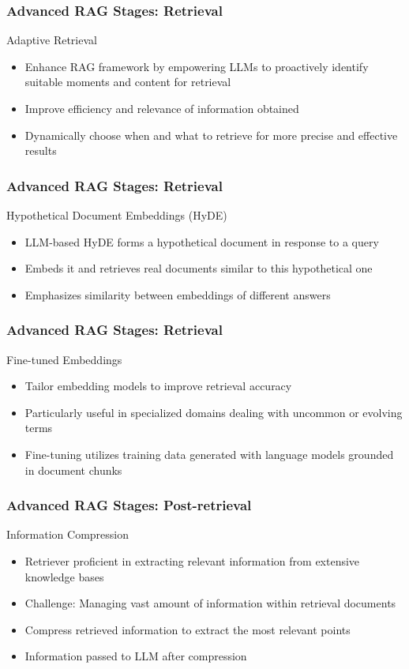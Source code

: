 \begin{frame}[fragile]\frametitle{Advanced RAG Stages: Retrieval}
Adaptive Retrieval
  \begin{itemize}
    \item Enhance RAG framework by empowering LLMs to proactively identify suitable moments and content for retrieval
    \item Improve efficiency and relevance of information obtained
    \item Dynamically choose when and what to retrieve for more precise and effective results
  \end{itemize}
\end{frame}

\begin{frame}[fragile]\frametitle{Advanced RAG Stages: Retrieval}
Hypothetical Document Embeddings (HyDE)
  \begin{itemize}
    \item LLM-based HyDE forms a hypothetical document in response to a query
    \item Embeds it and retrieves real documents similar to this hypothetical one
    \item Emphasizes similarity between embeddings of different answers
  \end{itemize}
\end{frame}

\begin{frame}[fragile]\frametitle{Advanced RAG Stages: Retrieval}
Fine-tuned Embeddings
  \begin{itemize}
    \item Tailor embedding models to improve retrieval accuracy
    \item Particularly useful in specialized domains dealing with uncommon or evolving terms
    \item Fine-tuning utilizes training data generated with language models grounded in document chunks
  \end{itemize}
\end{frame}


\begin{frame}[fragile]\frametitle{Advanced RAG Stages: Post-retrieval}
Information Compression
  \begin{itemize}
    \item Retriever proficient in extracting relevant information from extensive knowledge bases
    \item Challenge: Managing vast amount of information within retrieval documents
    \item Compress retrieved information to extract the most relevant points
    \item Information passed to LLM after compression
  \end{itemize}
\end{frame}


